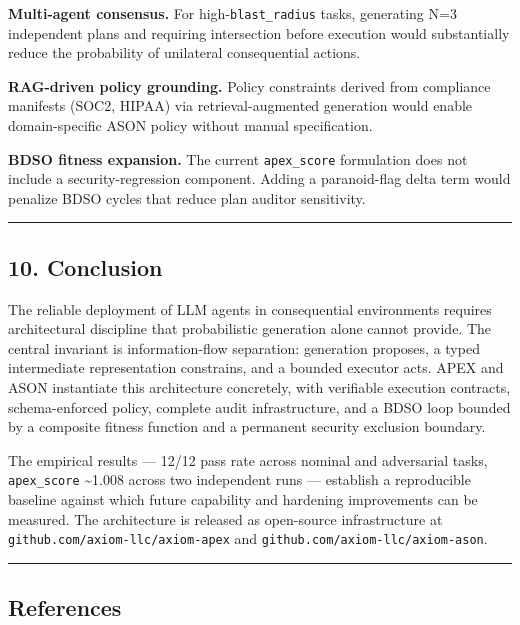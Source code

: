 \textbf{Multi-agent consensus.} For high-\texttt{blast\_radius} tasks,
generating N=3 independent plans and requiring intersection before
execution would substantially reduce the probability of unilateral
consequential actions.

\textbf{RAG-driven policy grounding.} Policy constraints derived from
compliance manifests (SOC2, HIPAA) via retrieval-augmented generation
would enable domain-specific ASON policy without manual specification.

\textbf{BDSO fitness expansion.} The current \texttt{apex\_score}
formulation does not include a security-regression component. Adding a
paranoid-flag delta term would penalize BDSO cycles that reduce plan
auditor sensitivity.

\begin{center}\rule{0.5\linewidth}{0.5pt}\end{center}

\subsection{10. Conclusion}\label{conclusion}

The reliable deployment of LLM agents in consequential environments
requires architectural discipline that probabilistic generation alone
cannot provide. The central invariant is information-flow separation:
generation proposes, a typed intermediate representation constrains, and
a bounded executor acts. APEX and ASON instantiate this architecture
concretely, with verifiable execution contracts, schema-enforced policy,
complete audit infrastructure, and a BDSO loop bounded by a composite
fitness function and a permanent security exclusion boundary.

The empirical results --- 12/12 pass rate across nominal and adversarial
tasks, \texttt{apex\_score} \textasciitilde1.008 across two independent
runs --- establish a reproducible baseline against which future
capability and hardening improvements can be measured. The architecture
is released as open-source infrastructure at
\texttt{github.com/axiom-llc/axiom-apex} and
\texttt{github.com/axiom-llc/axiom-ason}.

\begin{center}\rule{0.5\linewidth}{0.5pt}\end{center}

\subsection{References}\label{references}

